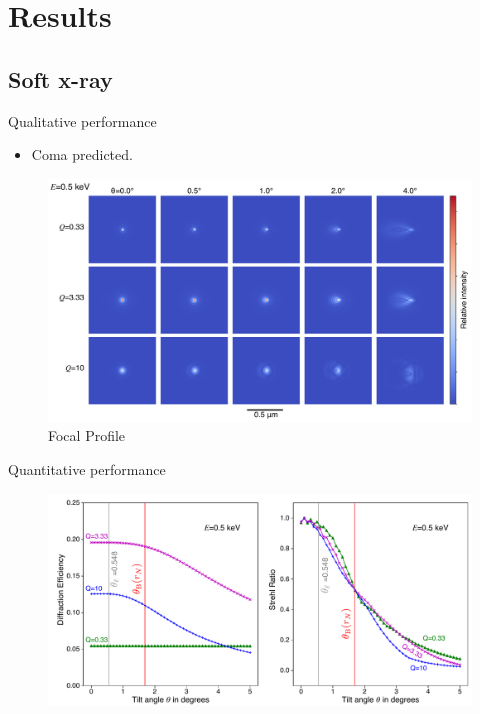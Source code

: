 \documentclass{beamer}
\begin{document}
\section{Results}
\subsection{Soft x-ray}
\begin{frame}{Qualitative performance}
	\begin{itemize}
		\item Coma predicted.
	\end{itemize}
		\begin{center}
			\begin{figure}
				\includegraphics[scale=0.29]{foc_spot_half}
				\caption{Focal Profile}
			\end{figure}
		\end{center}
\end{frame}

\begin{frame}{Quantitative performance}
		\begin{center}
			\begin{figure}
				\includegraphics[scale=0.4]{tilt_plot_half}
			\end{figure}
		\end{center}
\end{frame}
\end{document}
